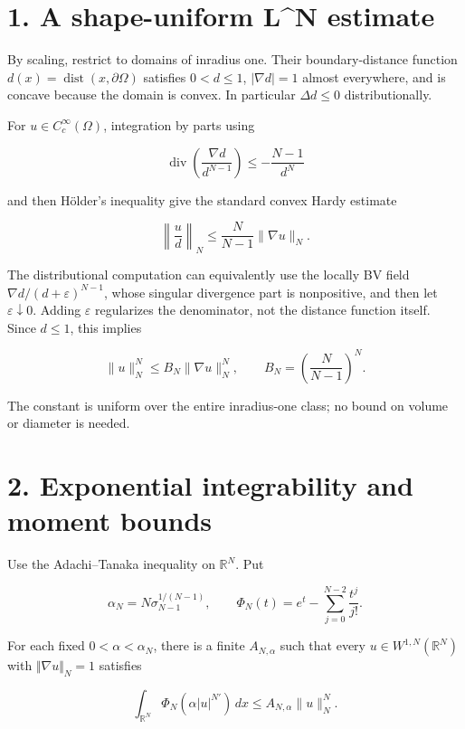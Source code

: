 \documentclass[11pt,a4paper]{article}
\begin{document}
\hypertarget{1016-a-shape-uniform-ln-estimate}{%
\section{1. A shape-uniform L\^{}N
estimate}\label{1016-a-shape-uniform-ln-estimate}}

By scaling, restrict to domains of inradius one. Their boundary-distance
function \(d(x)=\operatorname{dist}(x,\partial\Omega)\) satisfies
\(0<d\le 1\), \(|\nabla d|=1\) almost everywhere, and is concave because
the domain is convex. In particular \(\Delta d\le 0\) distributionally.

For \(u\in C_c^\infty(\Omega)\), integration by parts using

\[
\operatorname{div}\left(\frac{\nabla d}{d^{N-1}}\right)
\le-\frac{N-1}{d^N}
\]

and then Hölder's inequality give the standard convex Hardy estimate

\[
\left\|\frac{u}{d}\right\|_N
\le \frac{N}{N-1}\|\nabla u\|_N.
\]

The distributional computation can equivalently use the locally BV
field \(\nabla d/(d+\varepsilon)^{N-1}\), whose singular divergence
part is nonpositive, and then let \(\varepsilon\downarrow0\).
Adding \(\varepsilon\) regularizes the denominator, not the distance
function itself. Since \(d\le 1\), this implies

\[
\|u\|_N^N\le B_N\|\nabla u\|_N^N,
\qquad B_N=\left(\frac{N}{N-1}\right)^N.
\tag{2}
\]

The constant is uniform over the entire inradius-one class; no bound on
volume or diameter is needed.

\hypertarget{1016-exponential-integrability-and-moment-bounds}{%
\section{2. Exponential integrability and moment
bounds}\label{1016-exponential-integrability-and-moment-bounds}}

Use the Adachi--Tanaka inequality on \(\mathbb R^N\). Put

\[
\alpha_N=N\sigma_{N-1}^{1/(N-1)},\qquad
\Phi_N(t)=e^t-\sum_{j=0}^{N-2}\frac{t^j}{j!}.
\]

For each fixed \(0<\alpha <\alpha _N\), there is a finite
\(A_{N,\alpha}\) such that every \(u\in W^{1,N}(\mathbb R^N)\) with
\(\Vert \nabla u\Vert _N=1\) satisfies

\[
\int_{\mathbb R^N}\Phi_N(\alpha|u|^{N'})\,dx
\le A_{N,\alpha}\|u\|_N^N.
\tag{3}
\]
\end{document}

